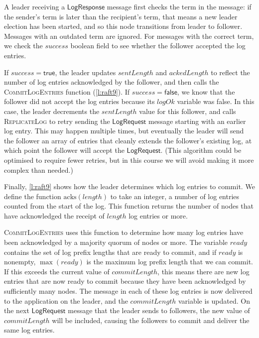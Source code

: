 A leader receiving a $\mathsf{LogResponse}$ message first checks the term in the message: if the sender's term is later than the recipient's term, that means a new leader election has been started, and so this node transitions from leader to follower.
Messages with an outdated term are ignored.
For messages with the correct term, we check the $\mathit{success}$ boolean field to see whether the follower accepted the log entries.

If $\mathit{success} = \mathsf{true}$, the leader updates $\mathit{sentLength}$ and $\mathit{ackedLength}$ to reflect the number of log entries acknowledged by the follower, and then calls the \textsc{CommitLogEntries} function (\autoref{l:raft9}).
If $\mathit{success} = \mathsf{false}$, we know that the follower did not accept the log entries because its $\mathit{logOk}$ variable was false.
In this case, the leader decrements the $\mathit{sentLength}$ value for this follower, and calls \textsc{ReplicateLog} to retry sending the $\mathsf{LogRequest}$ message starting with an earlier log entry.
This may happen multiple times, but eventually the leader will send the follower an array of entries that cleanly extends the follower's existing log, at which point the follower will accept the $\mathsf{LogRequest}$.
(This algorithm could be optimised to require fewer retries, but in this course we will avoid making it more complex than needed.)

Finally, \autoref{l:raft9} shows how the leader determines which log entries to commit.
We define the function $\mathrm{acks}(\mathit{length})$ to take an integer, a number of log entries counted from the start of the log.
This function returns the number of nodes that have acknowledged the receipt of $\mathit{length}$ log entries or more.

\textsc{CommitLogEntries} uses this function to determine how many log entries have been acknowledged by a majority quorum of nodes or more.
The variable $\mathit{ready}$ contains the set of log prefix lengths that are ready to commit, and if $\mathit{ready}$ is nonempty, $\max(\mathit{ready})$ is the maximum log prefix length that we can commit.
If this exceeds the current value of $\mathit{commitLength}$, this means there are new log entries that are now ready to commit because they have been acknowledged by sufficiently many nodes.
The message in each of these log entries is now delivered to the application on the leader, and the $\mathit{commitLength}$ variable is updated.
On the next $\mathsf{LogRequest}$ message that the leader sends to followers, the new value of $\mathit{commitLength}$ will be included, causing the followers to commit and deliver the same log entries.

